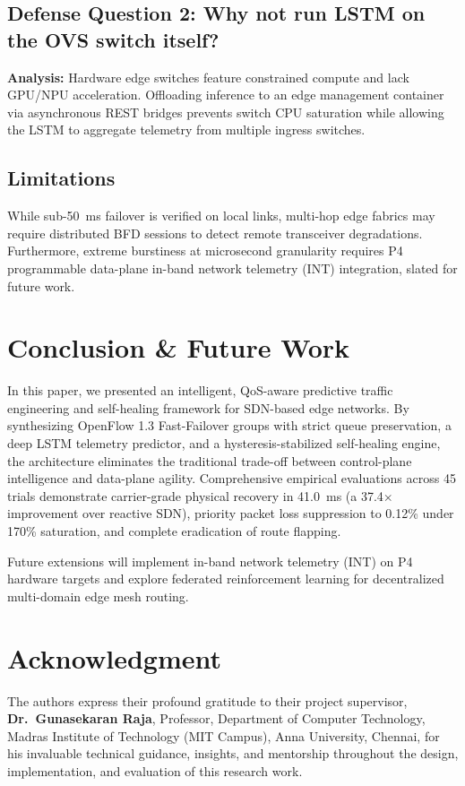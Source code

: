 \documentclass[conference]{IEEEtran}
\begin{document}
\subsection{Defense Question 2: Why not run LSTM on the OVS switch itself?}
\textbf{Analysis:} Hardware edge switches feature constrained compute and lack GPU/NPU acceleration. Offloading inference to an edge management container via asynchronous REST bridges prevents switch CPU saturation while allowing the LSTM to aggregate telemetry from multiple ingress switches.

\subsection{Limitations}
While sub-50~ms failover is verified on local links, multi-hop edge fabrics may require distributed BFD sessions to detect remote transceiver degradations. Furthermore, extreme burstiness at microsecond granularity requires P4 programmable data-plane in-band network telemetry (INT) integration, slated for future work.

\section{Conclusion \& Future Work}
In this paper, we presented an intelligent, QoS-aware predictive traffic engineering and self-healing framework for SDN-based edge networks. By synthesizing OpenFlow 1.3 Fast-Failover groups with strict queue preservation, a deep LSTM telemetry predictor, and a hysteresis-stabilized self-healing engine, the architecture eliminates the traditional trade-off between control-plane intelligence and data-plane agility. Comprehensive empirical evaluations across 45 trials demonstrate carrier-grade physical recovery in 41.0~ms (a 37.4$\times$ improvement over reactive SDN), priority packet loss suppression to 0.12\% under 170\% saturation, and complete eradication of route flapping. 

Future extensions will implement in-band network telemetry (INT) on P4 hardware targets and explore federated reinforcement learning for decentralized multi-domain edge mesh routing.

\section*{Acknowledgment}
The authors express their profound gratitude to their project supervisor, \textbf{Dr.~Gunasekaran Raja}, Professor, Department of Computer Technology, Madras Institute of Technology (MIT Campus), Anna University, Chennai, for his invaluable technical guidance, insights, and mentorship throughout the design, implementation, and evaluation of this research work.
\end{document}
